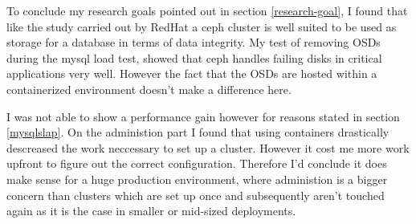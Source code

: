 \documentclass[titlepage, a4paper, 11pt]{scrartcl}
\begin{document}
        To conclude my research goals pointed out in section \ref*{research-goal}, I found that like the study carried out by RedHat\cite{redhatstudy} a ceph cluster is well suited to be used as storage for a database in terms of data integrity. My test of removing OSDs during the mysql load test, showed that ceph handles failing disks in critical applications very well. However the fact that the OSDs are hosted within a containerized environment doesn't make a difference here. 
        
        I was not able to show a performance gain however for reasons stated in section \ref*{mysqlslap}.
        On the administion part I found that using containers drastically descreased the work neccessary to set up a cluster. However it cost me more work upfront to figure out the correct configuration. Therefore I'd conclude it does make sense for a huge production environment, where administion is a bigger concern than clusters which are set up once and subsequently aren't touched again as it is the case in smaller or mid-sized deployments.
      
            
    
\end{document}

